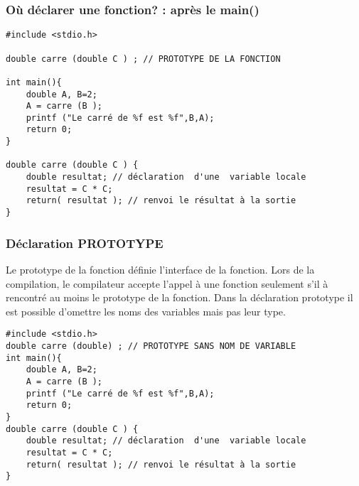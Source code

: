 \documentclass{beamer}
\begin{document}
\begin{frame}[fragile]
\frametitle{Où déclarer  une fonction? : après le main()}
\begin{verbatim}
#include <stdio.h>

double carre (double C ) ; // PROTOTYPE DE LA FONCTION

int main(){
 	double A, B=2;
  	A = carre (B );
 	printf ("Le carré de %f est %f",B,A);
    return 0;
}

double carre (double C ) {      
    double resultat; // déclaration  d'une  variable locale
    resultat = C * C;
    return( resultat ); // renvoi le résultat à la sortie
}

\end{verbatim}
\end{frame}



\begin{frame}[fragile]
\frametitle{Déclaration PROTOTYPE}
Le prototype de la fonction définie l'interface de la fonction. Lors de la compilation, le compilateur accepte l'appel à une fonction seulement s'il à rencontré au moins le prototype de la fonction. Dans la déclaration prototype il est possible d'omettre les noms des variables mais pas leur type.

\begin{verbatim}
#include <stdio.h>
double carre (double) ; // PROTOTYPE SANS NOM DE VARIABLE
int main(){
 	double A, B=2;
  	A = carre (B );
 	printf ("Le carré de %f est %f",B,A);
    return 0;
}
double carre (double C ) {      
    double resultat; // déclaration  d'une  variable locale
    resultat = C * C;
    return( resultat ); // renvoi le résultat à la sortie
}

\end{verbatim}
\end{frame}
\end{document}
